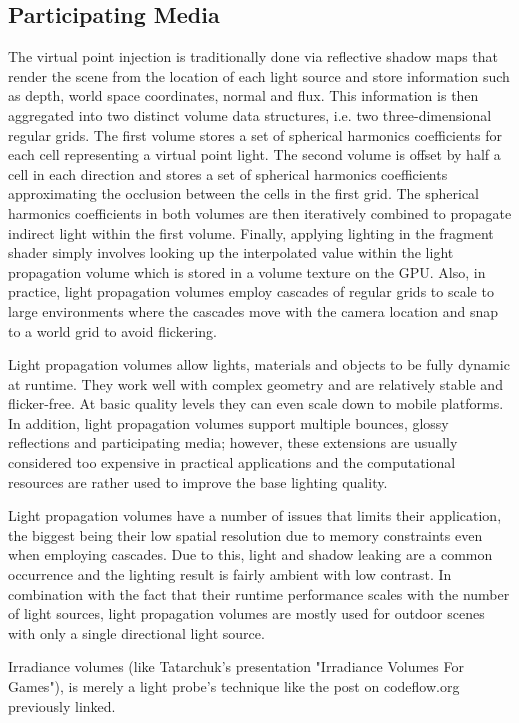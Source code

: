 \subsection{Participating Media}


The virtual point injection is traditionally done via reflective shadow maps that render the scene from the location of each light source and store information such as depth, world space coordinates, normal and flux. This information is then aggregated into two distinct volume data structures, i.e. two three-dimensional regular grids. The first volume stores a set of spherical harmonics coefficients for each cell representing a virtual point light. The second volume is offset by half a cell in each direction and stores a set of spherical harmonics coefficients approximating the occlusion between the cells in the first grid. The spherical harmonics coefficients in both volumes are then iteratively combined to propagate indirect light within the first volume. Finally, applying lighting in the fragment shader simply involves looking up the interpolated value within the light propagation volume which is stored in a volume texture on the GPU. Also, in practice, light propagation volumes employ cascades of regular grids to scale to large environments where the cascades move with the camera location and snap to a world grid to avoid flickering.

Light propagation volumes allow lights, materials and objects to be fully dynamic at runtime. They work well with complex geometry and are relatively stable and flicker-free. At basic quality levels they can even scale down to mobile platforms. In addition, light propagation volumes support multiple bounces, glossy reflections and participating media; however, these extensions are usually considered too expensive in practical applications and the computational resources are rather used to improve the base lighting quality.

Light propagation volumes have a number of issues that limits their application, the biggest being their low spatial resolution due to memory constraints even when employing cascades. Due to this, light and shadow leaking are a common occurrence and the lighting result is fairly ambient with low contrast. In combination with the fact that their runtime performance scales with the number of light sources, light propagation volumes are mostly used for outdoor scenes with only a single directional light source.

Irradiance volumes (like Tatarchuk's presentation "Irradiance Volumes For Games"), is merely a light probe's technique like the post on codeflow.org previously linked.


